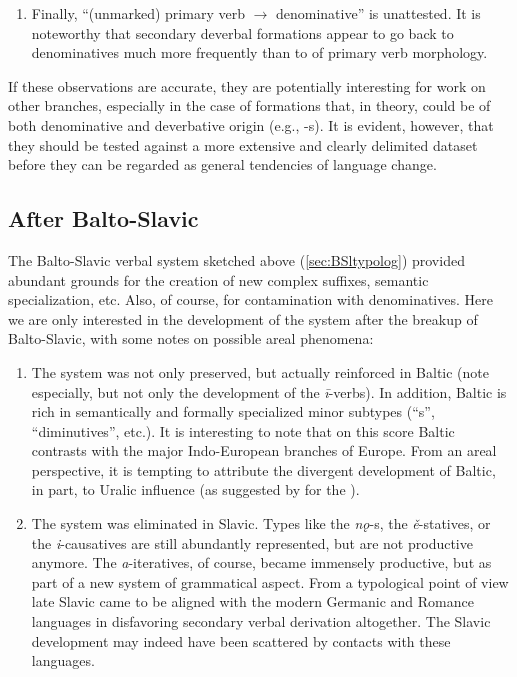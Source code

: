 \documentclass[output=paper,colorlinks,citecolor=brown]{langscibook}
\begin{document}
\begin{enumerate}
    \item Finally, “(unmarked) primary verb $\rightarrow$ denominative” is unattested. It is noteworthy that secondary deverbal formations appear to go back to denominatives much more frequently than to  of primary verb morphology. 
\end{enumerate}

If these observations are accurate, they are potentially interesting for work on other branches, especially in the case of formations that, in theory, could be of both denominative and deverbative origin (e.g., -s). It is evident, however, that they should be tested against a more extensive and clearly delimited dataset before they can be regarded as general tendencies of language change.

\subsection{After Balto-Slavic}
\label{sec:BSlafter}

The Balto-Slavic verbal system sketched above (\ref{sec:BSltypolog}) provided abundant grounds for the creation of new complex suffixes, semantic specialization, etc. Also, of course, for contamination with denominatives. Here we are only interested in the development of the system after the breakup of Balto-Slavic, with some notes on possible areal phenomena:

\begin{enumerate}
    \item The system was not only preserved, but actually reinforced in Baltic (note especially, but not only the development of the \textit{ī}-verbs). In addition, Baltic is rich in semantically and formally specialized minor subtypes (“s”, “diminutives”, etc.). It is interesting to note that on this score Baltic contrasts with the major Indo-European branches of Europe. From an areal perspective, it is tempting to attribute the divergent development of Baltic, in part, to Uralic influence (as suggested by \citealt{Pakerys2018} for the ).

    \item The system was eliminated in Slavic. Types like the \textit{nǫ}-s, the \textit{ě}-statives, or the \textit{i}-causatives are still abundantly represented, but are not productive anymore. The \textit{a}-iteratives, of course, became immensely productive, but as part of a new system of grammatical aspect. From a typological point of view late Slavic came to be aligned with the modern Germanic and Romance languages in disfavoring secondary  verbal derivation altogether. The Slavic development may indeed have been scattered by contacts with these languages.
\end{enumerate}
\end{document}
